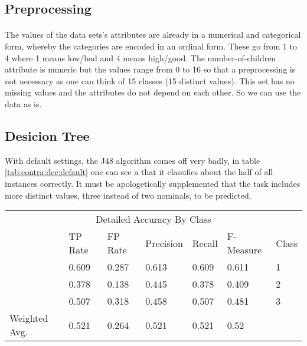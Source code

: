 \documentclass[paper=a4, fontsize=11pt]{scrartcl} %
\numberwithin{equation}{section} %
\numberwithin{figure}{section} %
\numberwithin{table}{section} %
\begin{document}
\subsection{Preprocessing}

\paragraph{}The values of the data sets's attributes are already in a numerical and categorical form, whereby the categories are encoded in an ordinal form. These go from 1 to 4 where 1 means low/bad and 4 means high/good. The number-of-children attribute is numeric but the values range from 0 to 16 so that a preprocessing is not necessary as one can think of 15 classes (15 distinct values). This set has no missing values and the attributes do not depend on each other. So we can use the data as is.


\subsection{Desicion Tree}

With default settings, the J48 algorithm comes off very badly, in table \ref{tab:contra:dec:default} one can see a that it classifies about the half of all instances correctly. It must be apologetically supplemented that the task includes more distinct values, three instead of two nominals, to be predicted. 

\begin{table*}[htb]\centering
  \begin{tabular*}{\columnwidth}{@{}lllllll@{}}
      \toprule 
      \multicolumn{7}{c}{Detailed Accuracy By Class} \\ 
               &  TP Rate & FP Rate & Precision & Recall & F-Measure &  Class \\ \midrule 
               &  0.609   & 0.287   & 0.613     & 0.609  & 0.611     &  1     \\  
               &  0.378   & 0.138   & 0.445     & 0.378  & 0.409     &  2     \\      
               &  0.507   & 0.318   & 0.458     & 0.507  & 0.481     &  3     \\      
Weighted Avg.  &  0.521   & 0.264   & 0.521     & 0.521  & 0.52      &        \\ \bottomrule     
    \end{tabular*}
\caption{Decision Tree on Contraceptive Data Set -- Default Settings} 
\label{tab:contra:dec:default}
\end{table*}
\FloatBarrier
\end{document}
